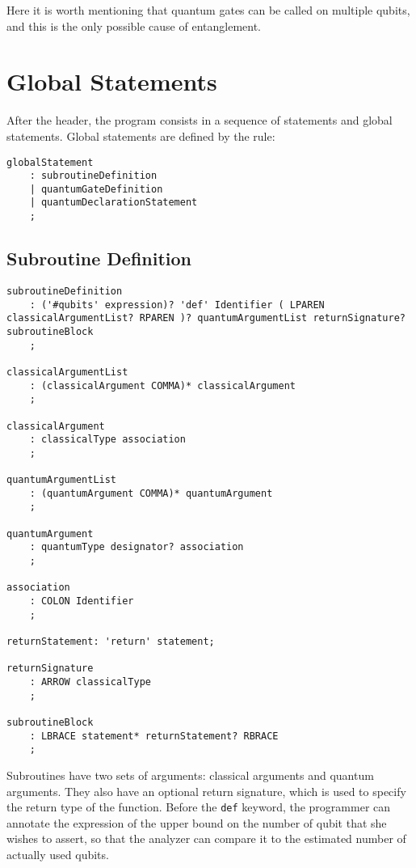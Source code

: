\documentclass[12pt,a4paper]{report}
\theoremstyle{definition}
\theoremstyle{definition}
\theoremstyle{definition}
\begin{document}
Here it is worth mentioning that quantum gates can be called on multiple qubits, and this is the only possible cause of entanglement.\\




\section{Global Statements}
After the header, the program consists in a sequence of statements and global statements. Global statements are defined by the rule:
\begin{lstlisting}
globalStatement
    : subroutineDefinition
    | quantumGateDefinition
    | quantumDeclarationStatement
    ;
\end{lstlisting}

\pagebreak

\subsection{Subroutine Definition}
\begin{lstlisting}
subroutineDefinition
    : ('#qubits' expression)? 'def' Identifier ( LPAREN classicalArgumentList? RPAREN )? quantumArgumentList returnSignature? subroutineBlock
    ;

classicalArgumentList
    : (classicalArgument COMMA)* classicalArgument
    ;

classicalArgument
    : classicalType association
    ;

quantumArgumentList
    : (quantumArgument COMMA)* quantumArgument
    ;

quantumArgument
    : quantumType designator? association
    ;

association
    : COLON Identifier
    ;

returnStatement: 'return' statement;

returnSignature
    : ARROW classicalType
    ;

subroutineBlock
    : LBRACE statement* returnStatement? RBRACE
    ;
\end{lstlisting}

Subroutines have two sets of arguments: classical arguments and quantum arguments. They also have an optional return signature, which is used to specify the return type of the function.
Before the \texttt{def} keyword, the programmer can annotate the expression of the upper bound on the number of qubit that she wishes to assert, so that the analyzer can compare it to the estimated number of actually used qubits.
\end{document}
